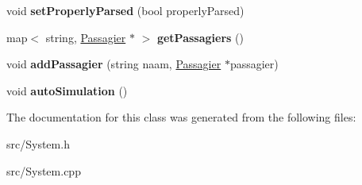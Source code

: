 \begin{DoxyCompactItemize}
\item 
void {\bfseries set\+Properly\+Parsed} (bool properly\+Parsed)\hypertarget{classSystem_af140010428a79ddde06f3546e7737d86}{}\label{classSystem_af140010428a79ddde06f3546e7737d86}

\item 
map$<$ string, \hyperlink{classPassagier}{Passagier} $\ast$ $>$ {\bfseries get\+Passagiers} ()\hypertarget{classSystem_a25bf1c319312604ce89890fa827f4552}{}\label{classSystem_a25bf1c319312604ce89890fa827f4552}

\item 
void {\bfseries add\+Passagier} (string naam, \hyperlink{classPassagier}{Passagier} $\ast$passagier)\hypertarget{classSystem_ad2a3016a3d4cf9273cf8156f4fc69dfb}{}\label{classSystem_ad2a3016a3d4cf9273cf8156f4fc69dfb}

\item 
void {\bfseries auto\+Simulation} ()\hypertarget{classSystem_ae392bbed93678914f3b0aff18c4a6d4d}{}\label{classSystem_ae392bbed93678914f3b0aff18c4a6d4d}

\end{DoxyCompactItemize}


The documentation for this class was generated from the following files\+:\begin{DoxyCompactItemize}
\item 
src/System.\+h\item 
src/System.\+cpp\end{DoxyCompactItemize}
